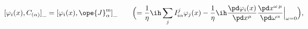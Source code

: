 \begin{equation}	\label{5.10}
[ \varphi_i(x) , C_{(\alpha)} ]_{\_}
=
[ \varphi_i(x) , \ope{J}_\alpha^{\mathrm{m}} ]_{\_}
\qquad
\Bigl(=
\frac{1}{\eta}
\ih \sum_{j} I_{i\alpha}^{j} \varphi_j(x)
-
\frac{1}{\eta}
\ih \frac{\pd\varphi_i(x)}{\pd x^\mu}
    \frac{\pd x^{\omega\,\mu}}{\pd \omega^\alpha}\Big|_{\omega=0}
\Bigr) ,
	\end{equation}

